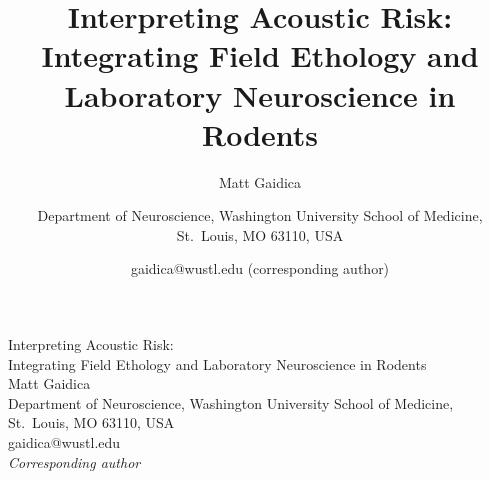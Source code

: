 \documentclass[12pt,letterpaper]{article}
\title{Interpreting Acoustic Risk: Integrating Field Ethology and Laboratory Neuroscience in Rodents}
\author{Matt Gaidica \and Department of Neuroscience, Washington University School of Medicine, St.~Louis, MO 63110, USA \and gaidica@wustl.edu (corresponding author)}
\date{}
\begin{document}
\ifpandoc\else
\begin{center}
  {\LARGE Interpreting Acoustic Risk:}\\[0.35em]
  {\large Integrating Field Ethology and Laboratory Neuroscience in Rodents}\\[1.1em]
  {\large Matt Gaidica}\\[0.45em]
  {\small
    Department of Neuroscience, Washington University School of Medicine,\\
    St.\ Louis, MO 63110, USA\\
    gaidica@wustl.edu\\[0.25em]
    \textit{Corresponding author}}
\end{center}
\vspace{1em}
\fi



\newpage









\clearpage
\setcounter{table}{0}
\renewcommand{\thetable}{S\arabic{table}}







\end{document}
